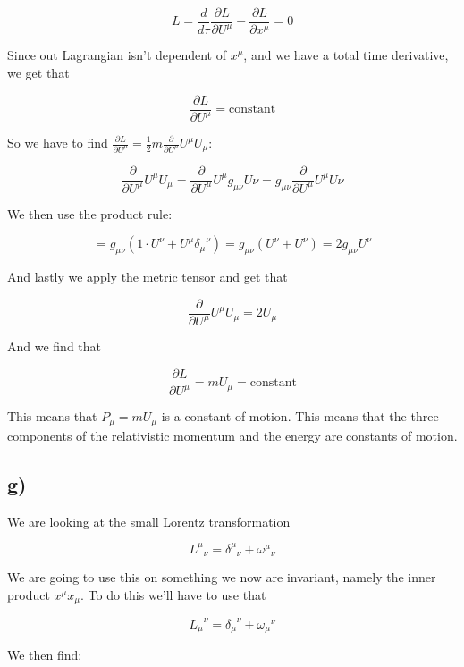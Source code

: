 \documentclass[a4paper,norsk, 10pt]{article}
\begin{document}
$$
L = \frac{d}{d\tau}\frac{\partial L}{\partial U^{\mu}} - \frac{\partial L}{\partial x^{\mu}} = 0
$$

Since out Lagrangian isn't dependent of $x^{\mu}$, and we have a total time derivative, we get that

\begin{equation}
\frac{\partial L}{\partial U^{\mu}}  = \text{constant}
\end{equation}

So we have to find $\frac{\partial L}{\partial U^{\mu}} = \frac{1}{2}m\frac{\partial }{\partial U^{\mu}} U^{\mu}U_{\mu} $:

$$
\frac{\partial }{\partial U^{\mu}} U^{\mu}U_{\mu} = \frac{\partial }{\partial U^{\mu}}  U^{\mu}g_{\mu \nu}U{\nu} = g_{\mu \nu}\frac{\partial }{\partial U^{\mu}}  U^{\mu}U{\nu}
$$

We then use the product rule:

$$
= g_{\mu \nu} \left(1\cdot U^{\nu} + U^{\mu}{\delta_{\mu}}^{\nu}\right) = g_{\mu \nu}\left(U^{\nu} + U^{\nu}\right) = 2g_{\mu \nu}U^{\nu}
$$

And lastly we apply the metric tensor and get that

$$
\frac{\partial }{\partial U^{\mu}} U^{\mu}U_{\mu} = 2U_{\mu}
$$

And we find that 

\begin{equation}
\frac{\partial L}{\partial U^{\mu}} = mU_{\mu} = \text{constant}
\end{equation}

This means that $P_{\mu} = mU_{\mu}$ is a constant of motion. This means that the three components of the relativistic momentum and the energy are constants of motion.

\subsection*{g)}
We are looking at the small Lorentz transformation

\begin{equation}
{L^{\mu}}_{\nu} = {\delta^{\mu}}_{\nu} + {\omega^{\mu}}_{\nu} 
\end{equation}

We are going to use this on something we now are invariant, namely the inner product $x^{\mu}x_{\mu}$. To do this we'll have to use that

$$
{L_{\mu}}^{\nu} = {\delta_{\mu}}^{\nu} + {\omega_{\mu}}^{\nu}
$$

We then find:
\end{document}
